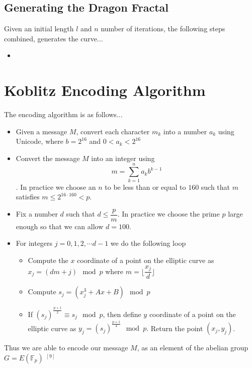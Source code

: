 \documentclass[a4paper,12pt]{article}
\begin{document}
\subsection{Generating the Dragon Fractal}
\begin{flushleft}
	Given an initial length $l$ and $n$ number of iterations, the following steps combined, generates the curve...
	\begin{itemize}
		\item
	\end{itemize}
\end{flushleft}

\section{Koblitz Encoding Algorithm}
\begin{flushleft}
	The encoding algorithm is as follows...\\
	\begin{itemize}
		\item Given a message $M$, convert each character $m_k$ into a number $a_k$ using Unicode, where $b=2^{16}$ and $0<a_k<2^{16}$
		\item Convert the message $M$ into an integer using $$m=\sum_{k=1}^n a_kb^{k-1}$$. In practice we choose an $n$ to be less than or equal to $160$ such that $m$ satisfies $m\le 2^{16\cdot 160}<p$.
		\item Fix a number $d$ such that $d\le \dfrac{p}{m}$. In practice we choose the prime $p$ large enough so that we can allow $d=100$.
		\item For integers $j=0,1,2,\cdots d-1$  we do the following loop
		\begin{itemize}
			\item Compute the $x$ coordinate of a point on the elliptic curve as $x_j=(dm+j)\mod p$ where $m=\bigg\lfloor{\dfrac{x_j}{d}}\bigg\rfloor$
			\item Compute $s_j=(x_j^3+Ax+B)\mod p$
			\item If $\left(s_j\right)^{\frac{p+1}{2}}\equiv s_j\mod p$, then define $y$ coordinate of a point on the elliptic curve as $y_j=\left(s_j\right)^{\frac{p+1}{4}}\mod p$. Return the point $(x_j,y_j)$.
		\end{itemize}
	\end{itemize}
	
	Thus we are able to encode our message $M$, as an element of the abelian group $G=E\left(\mathbb{F}_p\right)$ $^{[9]}$
\end{flushleft}
\end{document}
